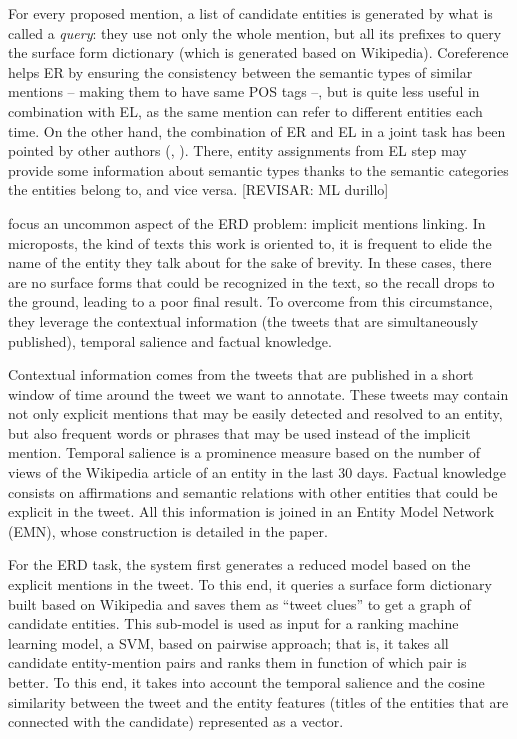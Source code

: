 For every proposed mention, a list of candidate entities is generated by what is called a \emph{query}: they use not only the whole mention, but all its prefixes to query the surface form dictionary (which is generated based on Wikipedia). Coreference helps ER by ensuring the consistency between the semantic types of similar mentions -- making them to have same POS tags --, but is quite less useful in combination with EL, as the same mention can refer to different entities each time. On the other hand, the combination of ER and EL in a joint task has been pointed by other authors (\cite{luo2015}, \cite{nguyen2016}). There, entity assignments from EL step may provide some information about semantic types thanks to the semantic categories the entities belong to, and vice versa. {\color{red}[REVISAR: ML durillo]}

\medskip

\cite{perera2016} focus an uncommon aspect of the ERD problem: implicit mentions linking. In microposts, the kind of texts this work is oriented to, it is frequent to elide the name of the entity they talk about for the sake of brevity. In these cases, there are no surface forms that could be recognized in the text, so the recall drops to the ground, leading to a poor final result. To overcome from this circumstance, they leverage the contextual information (the tweets that are simultaneously published), temporal salience and factual knowledge.

Contextual information comes from the tweets that are published in a short window of time around the tweet we want to annotate. These tweets may contain not only explicit mentions that may be easily detected and resolved to an entity, but also frequent words or phrases that may be used instead of the implicit mention. Temporal salience is a prominence measure based on the number of views of the Wikipedia article of an entity in the last 30 days. Factual knowledge consists on affirmations and semantic relations with other entities that could be explicit in the tweet. All this information is joined in an Entity Model Network (EMN), whose construction is detailed in the paper.

For the ERD task, the system first generates a reduced model based on the explicit mentions in the tweet. To this end, it queries a surface form dictionary built based on Wikipedia and saves them as ``tweet clues'' to get a graph of candidate entities. This sub-model is used as input for a ranking machine learning model, a SVM, based on pairwise approach; that is, it takes all candidate entity-mention pairs and ranks them in function of which pair is better. To this end, it takes into account the temporal salience and the cosine similarity between the tweet and the entity features (titles of the entities that are connected with the candidate) represented as a vector.

